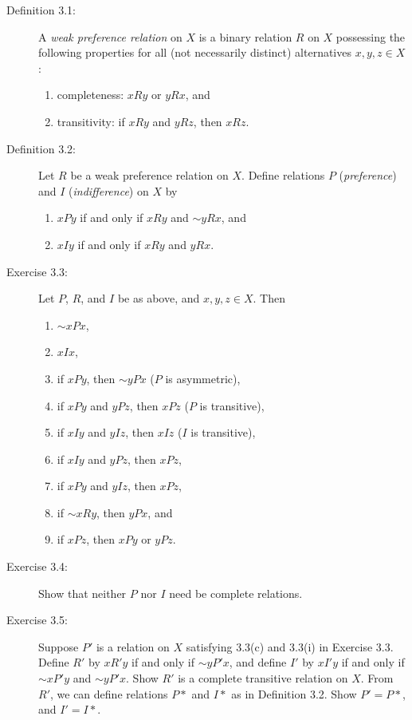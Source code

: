 \documentclass{article}
\begin{document}
\begin{description}

\item[Definition 3.1:] A \emph{weak preference relation} on $X$ is a binary relation $R$ on $X$ possessing the following properties for all (not necessarily distinct) alternatives $x, y, z \in X$:
  \begin{enumerate}[\hspace{1cm}(a)]
    \item completeness: $xRy$ or $yRx$, and
    \item transitivity: if $xRy$ and $yRz$, then $xRz$.
  \end{enumerate}

\item[Definition 3.2:] Let $R$ be a weak preference relation on $X$. Define relations $P$ (\emph{preference}) and $I$ (\emph{indifference}) on $X$ by
  \begin{enumerate}[\hspace{1cm}(a)]
    \item $xPy$ if and only if $xRy$ and $\sim yRx$, and
    \item $xIy$ if and only if $xRy$ and $yRx$.
  \end{enumerate}

\item[Exercise 3.3:] Let $P$, $R$, and $I$ be as above, and $x,y,z \in X$. Then 
  \begin{enumerate}[\hspace{1cm}(a)]
    \item $\sim xPx$, 
    \item $xIx$, 
    \item if $xPy$, then $\sim yPx$ ($P$ is asymmetric), 
    \item if $xPy$ and $yPz$, then $xPz$ ($P$ is transitive), 
    \item if $xIy$ and $yIz$, then $xIz$ ($I$ is transitive), 
    \item if $xIy$ and $yPz$, then $xPz$, 
    \item if $xPy$ and $yIz$, then $xPz$, 
    \item if $\sim xRy$, then $yPx$, and 
    \item if $xPz$, then $xPy$ or $yPz$.
  \end{enumerate}

\item[Exercise 3.4:] Show that neither $P$ nor $I$ need be complete relations.

\item[Exercise 3.5:] Suppose $P'$ is a relation on $X$ satisfying 3.3(c) and 3.3(i) in Exercise 3.3. Define $R'$ by $xR'y$ if and only if $\sim yP'x$, and define $I'$ by $xI'y$ if and only if $\sim xP'y$ and $\sim yP'x$. Show $R'$ is a complete transitive relation on $X$. From $R'$, we can define relations $P*$ and $I*$ as in Definition 3.2. Show $P' = P*$, and $I' = I*$.

\end{description}
\end{document}
